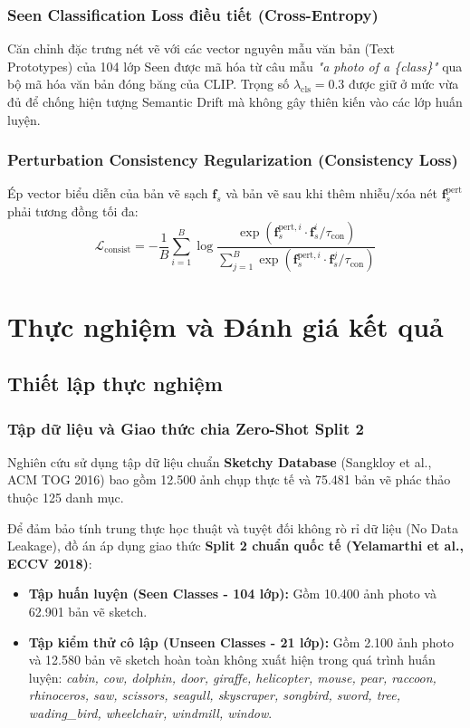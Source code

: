 \documentclass[12pt,a4paper]{report}
\begin{document}
\subsection{Seen Classification Loss điều tiết (Cross-Entropy)}
Căn chỉnh đặc trưng nét vẽ với các vector nguyên mẫu văn bản (Text Prototypes) của 104 lớp Seen được mã hóa từ câu mẫu \textit{"a photo of a \{class\}"} qua bộ mã hóa văn bản đóng băng của CLIP. Trọng số $\lambda_{\text{cls}} = 0.3$ được giữ ở mức vừa đủ để chống hiện tượng Semantic Drift mà không gây thiên kiến vào các lớp huấn luyện.

\subsection{Perturbation Consistency Regularization (Consistency Loss)}
Ép vector biểu diễn của bản vẽ sạch $\mathbf{f}_s$ và bản vẽ sau khi thêm nhiễu/xóa nét $\mathbf{f}_s^{\text{pert}}$ phải tương đồng tối đa:
\begin{equation}
    \mathcal{L}_{\text{consist}} = -\frac{1}{B} \sum_{i=1}^B \log \frac{\exp(\mathbf{f}_s^{\text{pert}, i} \cdot \mathbf{f}_s^i / \tau_{\text{con}})}{\sum_{j=1}^B \exp(\mathbf{f}_s^{\text{pert}, i} \cdot \mathbf{f}_s^j / \tau_{\text{con}})}
\end{equation}

\chapter{Thực nghiệm và Đánh giá kết quả}

\section{Thiết lập thực nghiệm}
\subsection{Tập dữ liệu và Giao thức chia Zero-Shot Split 2}
Nghiên cứu sử dụng tập dữ liệu chuẩn \textbf{Sketchy Database} (Sangkloy et al., ACM TOG 2016) bao gồm 12.500 ảnh chụp thực tế và 75.481 bản vẽ phác thảo thuộc 125 danh mục.

Để đảm bảo tính trung thực học thuật và tuyệt đối không rò rỉ dữ liệu (No Data Leakage), đồ án áp dụng giao thức \textbf{Split 2 chuẩn quốc tế (Yelamarthi et al., ECCV 2018)}:
\begin{itemize}[leftmargin=*]
    \item \textbf{Tập huấn luyện (Seen Classes - 104 lớp):} Gồm 10.400 ảnh photo và 62.901 bản vẽ sketch.
    \item \textbf{Tập kiểm thử cô lập (Unseen Classes - 21 lớp):} Gồm 2.100 ảnh photo và 12.580 bản vẽ sketch hoàn toàn không xuất hiện trong quá trình huấn luyện: \textit{cabin, cow, dolphin, door, giraffe, helicopter, mouse, pear, raccoon, rhinoceros, saw, scissors, seagull, skyscraper, songbird, sword, tree, wading\_bird, wheelchair, windmill, window}.
\end{itemize}
\end{document}
